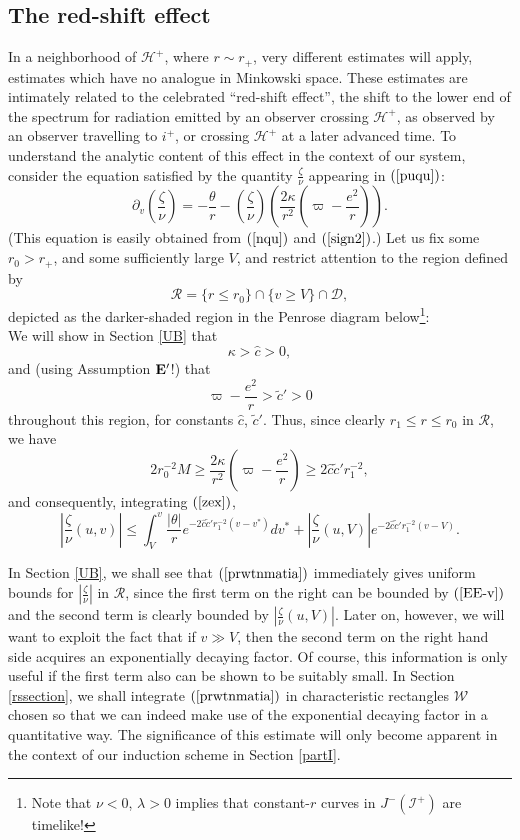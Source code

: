 \documentclass{article}
\newcommand{\zn}{\frac{\zeta}{\nu}}
\begin{document}
\subsection{The red-shift effect}
In a neighborhood of $\mathcal{H}^+$, where $r\sim r_+$, very different
estimates will apply, estimates which have no analogue in Minkowski space.
These estimates are intimately related to the celebrated ``red-shift effect'',
the shift to the lower end of the spectrum for radiation emitted by
an observer crossing $\mathcal{H}^+$, as observed by an observer travelling
to $i^+$, or crossing $\mathcal{H}^+$ at a later advanced time.
To understand the analytic content of this effect in the context of
our system,
consider the equation satisfied by the quantity $\zn$ appearing
in $(\ref{puqu})$:
\begin{equation}
\label{zex}
\partial_v\left(\zn\right)=
-\frac{\theta}r-\left(\zn\right)\left(\frac{2\kappa}{r^2}\left(
\varpi-\frac{e^2}r\right)\right).
\end{equation}
(This equation is easily obtained from $(\ref{nqu})$ and $(\ref{sign2})$.)
Let us fix some $r_0>r_+$, and some sufficiently large $V$,
and restrict attention
to the region defined by 
\[
\mathcal{R}=\{r\le r_0\}\cap\{v\ge V\}\cap\mathcal{D},
\]
depicted as the darker-shaded
region in the Penrose diagram below\footnote{Note that $\nu<0$, $\lambda>0$
implies that constant-$r$ curves in $J^-(\mathcal{I}^+)$ are timelike!}:
\[

\]
We will show in Section \ref{UB}  that 
\[
\kappa>\hat{c}>0,
\] 
and (using Assumption ${\bf E}'$!)
that
\[
\varpi-\frac{e^2}r>\tilde{c}'>0
\]
throughout this region, for constants $\hat{c}$, $\tilde{c}'$.
Thus, since clearly $r_1\le r\le r_0$ in $\mathcal{R}$,
we have 
\[
2r_0^{-2}M\ge
\frac{2\kappa}{r^2}\left(
\varpi-\frac{e^2}r\right)\ge2\hat{c}\tilde{c}'r_1^{-2},
\]
and consequently, integrating $(\ref{zex})$,
\begin{equation}
\label{prwtnmatia}
\left|\zn(u,v)\right|
\le
\int_V^{v}\frac{|\theta|}{r}e^{-2\hat{c}\tilde{c}'r_1^{-2}(v-v^*)}dv^*
+\left|\zn(u,V)\right|e^{-2\hat{c}\tilde{c}'r_1^{-2}(v-V)}.
\end{equation}

In Section \ref{UB}, we shall see that $(\ref{prwtnmatia})$ immediately
gives uniform bounds for $\left|\zn\right|$ in $\mathcal{R}$, since the first
term on the right can be bounded by
$(\ref{EE-v})$ and the second term is clearly bounded by $\left|\zn(u,V)\right|$.
Later on, however, we will want to exploit the fact that if
$v\gg V$, then the second term
on the right hand side acquires an exponentially decaying factor.
Of course, this information is only useful if the first term also can be shown
to be suitably small. In Section \ref{rssection}, 
we shall integrate $(\ref{prwtnmatia})$
in characteristic
rectangles $\mathcal{W}$ chosen so that we can indeed make use of the exponential
decaying factor in a quantitative way. 
The significance of this estimate will only become apparent
in the context of our induction scheme in Section \ref{partI}.
\end{document}
